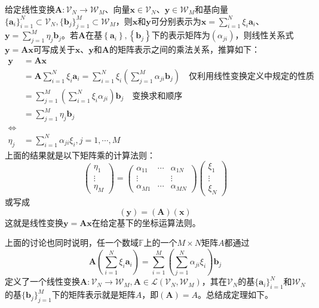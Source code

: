 \documentclass[main.tex]{subfiles}
\begin{document}
给定线性变换$\mathbf{A}:\mathcal{V}_N\rightarrow\mathcal{W}_M$、向量$\mathbf{x}\in\mathcal{V}_N$、$\mathbf{y}\in\mathcal{W}_M$和基向量$\{\mathbf{a}_i\}_{i=1}^N\subset\mathcal{V}_N,\{\mathbf{b}_j\}_{j=1}^M\subset\mathcal{W}_M$，则$\mathbf{x}$和$\mathbf{y}$可分别表示为$\mathbf{x}=\sum_{i=1}^N\xi_i\mathbf{a}_i$、$\mathbf{y}=\sum_{j=1}^M\eta_j\mathbf{b}_j$。若$\mathbf{A}$在基$\left\{\mathbf{a}_i\right\},\left\{\mathbf{b}_j\right\}$下的表示矩阵为$\left(\alpha_{ji}\right)$，则线性关系式$\mathbf{y}=\mathbf{Ax}$可写成关于$\mathbf{x}$、$\mathbf{y}$和$\mathbf{A}$的矩阵表示之间的乘法关系，推算如下：
\begin{equation*}
\begin{split}
    \mathbf{y}&=\mathbf{Ax}\\
    &=\mathbf{A}\sum_{i=1}^N\xi_i\mathbf{a}_i=\sum_{i=1}^N\xi_i\left(\sum_{j=1}^M\alpha_{ji}\mathbf{b}_j\right)\quad\text{仅利用线性变换定义中规定的性质}\\
    &=\sum_{j=1}^M\left(\sum_{i=1}^N\xi_i\alpha_{ji}\right)\mathbf{b}_j\quad\text{变换求和顺序}\\
    &=\sum_{j=1}^M\eta_j\mathbf{b}_j\\
    \Leftrightarrow\\
    \eta_j&=\sum_{i=1}^N\alpha_{ji}\xi_i,j=1,\cdots,M
\end{split}
\end{equation*}
上面的结果就是以下矩阵乘的计算法则：
\[\left(\begin{array}{ccc}\eta_1\\\vdots\\\eta_M\end{array}\right)=\left(\begin{array}{ccc}\alpha_{11}&\cdots&\alpha_{1N}\\\vdots&&\vdots\\\alpha_{M1}&\cdots&\alpha_{MN}\end{array}\right)\left(\begin{array}{ccc}\xi_1\\\vdots\\\xi_N\end{array}\right)\]
或写成
\[\left(\mathbf{y}\right)=\left(\mathbf{A}\right)\left(\mathbf{x}\right)\]
这就是线性变换$\mathbf{y}=\mathbf{Ax}$在给定基下的坐标运算法则。

上面的讨论也同时说明，任一个数域$\mathbb{F}$上的一个$M\times N$矩阵$A$都通过
\[
\mathbf{A}\left(\sum_{i=1}^N\xi_i\mathbf{a}_i\right)=\sum_{i=1}^M\left(\sum_{j=1}^N\alpha_{ji}\xi_i\right)\mathbf{b}_j
\]
定义了一个线性变换$\mathbf{A}:\mathcal{V}_N\rightarrow\mathcal{W}_M,\mathbf{A}\in\mathcal{L}\left(\mathcal{V}_N,\mathcal{W}_M\right)$，其在$\mathcal{V}_N$的基$\{\mathbf{a}_i\}_{i=1}^N$和$\mathcal{W}_N$的基$\{\mathbf{b}_j\}_{j=1}^M$下的矩阵表示就是矩阵$A$，即$\left(\mathbf{A}\right)=A$。总结成定理如下。
\end{document}
